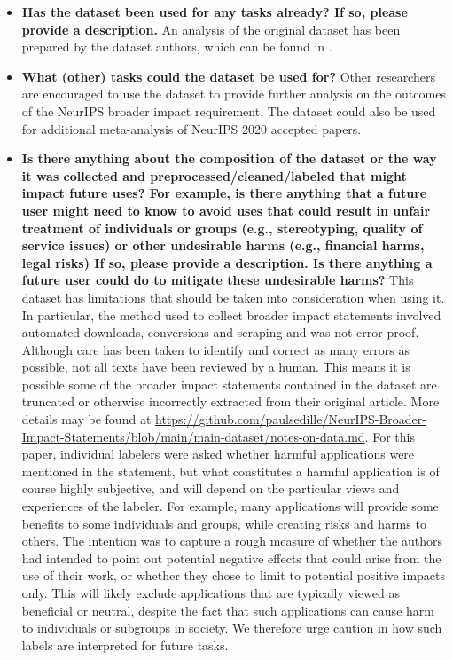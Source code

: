 \documentclass{article}
\begin{document}
\begin{itemize}
    \item \textbf{Has the dataset been used for any tasks already? If so, please provide a description.} An analysis of the original dataset has been prepared by the dataset authors, which can be found in \citet{ashurst2021aiethics}.
    \item \textbf{What (other) tasks could the dataset be used for?} Other researchers are encouraged to use the dataset to provide further analysis on the outcomes of the NeurIPS broader impact requirement. The dataset could also be used for additional meta-analysis of NeurIPS 2020 accepted papers.
    \item \textbf{Is there anything about the composition of the dataset or the way it was collected and preprocessed/cleaned/labeled that might impact future uses? For example, is there anything that a future user might need to know to avoid uses that could result in unfair treatment of individuals or groups (e.g., stereotyping, quality of service issues) or other undesirable harms (e.g., financial harms, legal risks) If so, please provide a description. Is there anything a future user could do to mitigate these undesirable harms?} This dataset has limitations that should be taken into consideration when using it. In particular, the method used to collect broader impact statements involved automated downloads, conversions and scraping and was not error-proof. Although care has been taken to identify and correct as many errors as possible, not all texts have been reviewed by a human. This means it is possible some of the broader impact statements contained in the dataset are truncated or otherwise incorrectly extracted from their original article. More details may be found at \href{https://github.com/paulsedille/NeurIPS-Broader-Impact-Statements/blob/main/main-dataset/notes-on-data.md}{https://github.com/paulsedille/NeurIPS-Broader-Impact-Statements/blob/main/main-dataset/notes-on-data.md}. For this paper, individual labelers were asked whether harmful applications were mentioned in the statement, but what constitutes a harmful application is of course highly subjective, and will depend on the particular views and experiences of the labeler. For example, many applications will provide some benefits to some individuals and groups, while creating risks and harms to others. The intention was to capture a rough measure of whether the authors had intended to point out potential negative effects that could arise from the use of their work, or whether they chose to limit to potential positive impacts only. This will likely exclude applications that are typically viewed as beneficial or neutral, despite the fact that such applications can cause harm to individuals or subgroups in society. We therefore urge caution in how such labels are interpreted for future tasks. 
\end{itemize}
\end{document}
